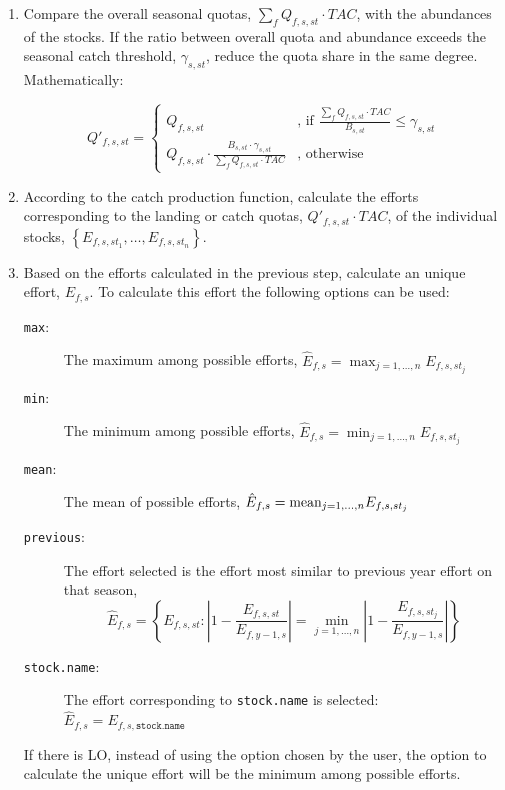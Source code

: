 \begin{enumerate}
	
	\item Compare the overall seasonal quotas, $\sum_f Q_{f,s,st}\cdot TAC$, with the abundances of the stocks.
		 If the ratio between overall quota and abundance exceeds the 
		seasonal catch threshold, $\gamma_{s,st}$, reduce the quota share in the same degree. Mathematically: 
		
	\begin{equation}
		Q'_{f,s,st} = 
			\begin{cases}
			 		Q_{f,s,st}	     & \text{, if }  \frac{\sum_f Q_{f,s,st}\cdot TAC}{B_{s,st}} \leq \gamma_{s,st}\\
   					Q_{f,s,st}\cdot \frac{B_{s,st}\cdot \gamma_{s,st}}{\sum_f Q_{f,s,st}\cdot TAC}   & \text{, otherwise} 
			\end{cases} 
	\end{equation}
		
  \item According to the catch production function, calculate the efforts corresponding to the landing or 
		catch quotas, $Q'_{f,s,st}\cdot TAC$, of the  
		individual stocks, $\left\{ E_{f,s,st_1},\ldots, E_{f,s,st_n} \right\}$.
	
	\item Based on the efforts calculated in the previous step, calculate an unique effort, $E_{f,s}$. 
		To calculate this effort the following options can be used:
		\begin{description}  
			\item[\texttt{max}:] The maximum among possible efforts, $\hat{E}_{f,s} = \max_{j=1,\ldots,n} E_{f,s,st_j}$
			\item[\texttt{min}:] The minimum among possible efforts, $\hat{E}_{f,s} = \min_{j=1,\ldots,n} E_{f,s,st_j}$
			\item[\texttt{mean}:] The mean of possible efforts, $\hat{E}_{f,s} =  \text{mean}_{j=1,\ldots,n} E_{f,s,st_j}$
			\item[\texttt{previous}:] The effort selected is the effort most similar to previous year effort on 
				that season, 
				$$\hat{E}_{f,s} = \left\{ E_{f,s,st} :   
				\left|1 - \frac{E_{f,s,st}}{E_{f,y-1,s}}\right| = \min_{j=1,\ldots,n} \left|1 - \frac{E_{f,s,st_j}}{E_{f,y-1,s}}\right|\right\}$$
  	 	\item[\texttt{stock.name}:] The effort corresponding to \texttt{stock.name} is selected:
				$\hat{E}_{f,s} =  E_{f,s,\texttt{stock.name}}$
		\end{description}
		If  there is LO, instead of using the option chosen by the user, the option to calculate the unique effort 
		will be the minimum among possible efforts.
	

\end{enumerate}
